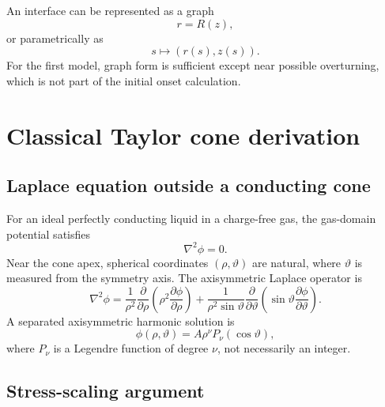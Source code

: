 \documentclass[11pt]{article}
\begin{document}
An interface can be represented as a graph
\begin{equation}
    r=R(z),
\end{equation}
or parametrically as
\begin{equation}
    s\mapsto (r(s),z(s)).
\end{equation}
For the first model, graph form is sufficient except near possible overturning, which is not part of the initial onset calculation.

\section{Classical Taylor cone derivation}

\subsection{Laplace equation outside a conducting cone}

For an ideal perfectly conducting liquid in a charge-free gas, the gas-domain potential satisfies
\begin{equation}
    \nabla^2\phi=0.
\end{equation}
Near the cone apex, spherical coordinates \((\rho,\vartheta)\) are natural, where \(\vartheta\) is measured from the symmetry axis.  The axisymmetric Laplace operator is
\begin{equation}
\nabla^2\phi
=
\frac{1}{\rho^2}\frac{\partial}{\partial\rho}
\left(\rho^2\frac{\partial\phi}{\partial\rho}\right)
+
\frac{1}{\rho^2\sin\vartheta}\frac{\partial}{\partial\vartheta}
\left(\sin\vartheta\frac{\partial\phi}{\partial\vartheta}\right).
\end{equation}
A separated axisymmetric harmonic solution is
\begin{equation}
    \phi(\rho,\vartheta)=A\rho^\nu P_\nu(\cos\vartheta),
    \label{eq:separated}
\end{equation}
where \(P_\nu\) is a Legendre function of degree \(\nu\), not necessarily an integer.

\subsection{Stress-scaling argument}
\end{document}
